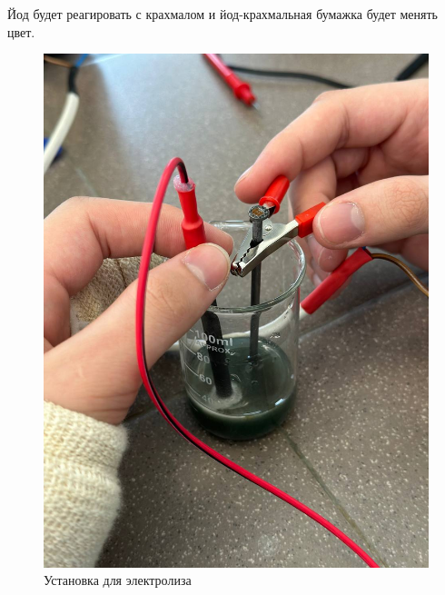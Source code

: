 \documentclass[a4paper,12pt]{article}
\begin{document}
Йод будет реагировать с крахмалом и йод-крахмальная бумажка будет менять цвет.
\begin{figure}[h] 
 
\centering 
 
\includegraphics[scale=0.4]{elec.jpg} 
 
\caption{Установка для электролиза} 
 
\label{fig:mpr} 
\end{figure}  
\end{document}
